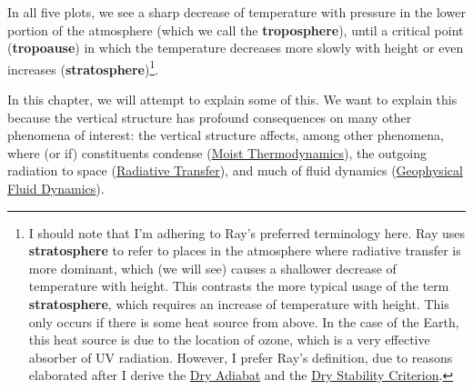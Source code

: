 In all five plots, we see a sharp decrease of temperature with pressure in the lower portion of the atmosphere (which we call the \textbf{troposphere}), until a critical point (\textbf{tropoause}) in which the temperature decreases more slowly with height or even increases (\textbf{stratosphere})\footnote{
    I should note that I'm adhering to Ray's preferred terminology here. Ray uses \textbf{stratosphere} to refer to places in the atmosphere where radiative transfer is more dominant, which (we will see) causes a shallower decrease of temperature with height. This contrasts the more typical usage of the term \textbf{stratosphere}, which requires an increase of temperature with height. This only occurs if there is some heat source from above. In the case of the Earth, this heat source is due to the location of ozone, which is a very effective absorber of UV radiation. However, I prefer Ray's definition, due to reasons elaborated after I derive the \hyperref[Dry Adiabat Box]{Dry Adiabat} and the \hyperref[Dry Stability Box]{Dry Stability Criterion}. 
}.

In this chapter, we will attempt to explain some of this. We want to explain this because the vertical structure has profound consequences on many other phenomena of interest: the vertical structure affects, among other phenomena, where (or if) constituents condense (\hyperref[Moist Thermodynamics]{Moist Thermodynamics}), the outgoing radiation to space (\hyperref[Radiative Transfer]{Radiative Transfer}), and much of fluid dynamics (\hyperref[Geophysical Fluid Dynamics]{Geophysical Fluid Dynamics}). 


